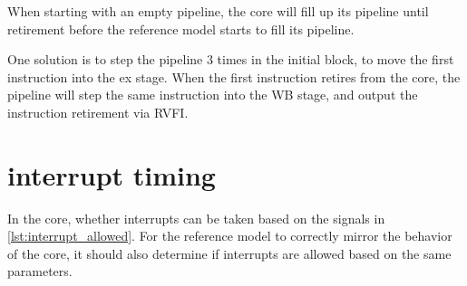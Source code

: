 When starting with an empty pipeline, the core will fill up its pipeline until retirement before the reference model starts to fill its pipeline. 

One solution is to step the pipeline 3 times in the initial block, to move the first instruction into the ex stage. When the first instruction retires from the core, the pipeline will step the same instruction into the WB stage, and output the instruction retirement via RVFI. 


%



\section{interrupt timing}
\label{sec:interrupttiming}

In the core, whether interrupts can be taken based on the signals in \cref{lst:interrupt_allowed}. For the reference model to correctly mirror the behavior of the core, it should also determine if interrupts are allowed based on the same parameters.


